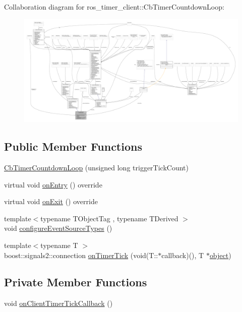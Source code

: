 Collaboration diagram for ros\+\_\+timer\+\_\+client\+:\+:Cb\+Timer\+Countdown\+Loop\+:
\nopagebreak
\begin{figure}[H]
\begin{center}
\leavevmode
\includegraphics[width=350pt]{classros__timer__client_1_1CbTimerCountdownLoop__coll__graph}
\end{center}
\end{figure}
\subsection*{Public Member Functions}
\begin{DoxyCompactItemize}
\item 
\hyperlink{classros__timer__client_1_1CbTimerCountdownLoop_aadceff62d42bac73682da8d729fe9c36}{Cb\+Timer\+Countdown\+Loop} (unsigned long trigger\+Tick\+Count)
\item 
virtual void \hyperlink{classros__timer__client_1_1CbTimerCountdownLoop_ae547ef69c9ce8029b0f5f27120155c9f}{on\+Entry} () override
\item 
virtual void \hyperlink{classros__timer__client_1_1CbTimerCountdownLoop_aa671fabe23945e85e65cee7a3c1e761b}{on\+Exit} () override
\item 
{\footnotesize template$<$typename T\+Object\+Tag , typename T\+Derived $>$ }\\void \hyperlink{classros__timer__client_1_1CbTimerCountdownLoop_a8e0193f4b75805b2b15fe6e63c631670}{configure\+Event\+Source\+Types} ()
\item 
{\footnotesize template$<$typename T $>$ }\\boost\+::signals2\+::connection \hyperlink{classros__timer__client_1_1CbTimerCountdownLoop_a7ebf87093607e9497f18eb0ded9fc1f9}{on\+Timer\+Tick} (void(T\+::$\ast$callback)(), T $\ast$\hyperlink{classobject}{object})
\end{DoxyCompactItemize}
\subsection*{Private Member Functions}
\begin{DoxyCompactItemize}
\item 
void \hyperlink{classros__timer__client_1_1CbTimerCountdownLoop_a8b3cbf593a9d3823cd1f56611fb0a0b3}{on\+Client\+Timer\+Tick\+Callback} ()
\end{DoxyCompactItemize}
